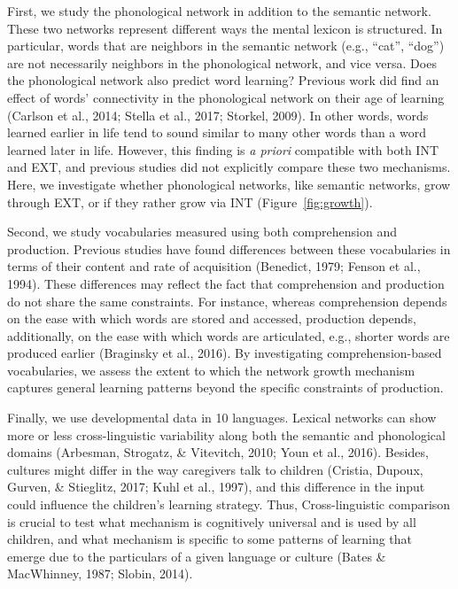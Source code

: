 \documentclass[english,floatsintext,man]{apa6}
\theoremstyle{definition}
\theoremstyle{definition}
\theoremstyle{definition}
\theoremstyle{remark}
\begin{document}
First, we study the phonological network in addition to the semantic
network. These two networks represent different ways the mental lexicon
is structured. In particular, words that are neighbors in the semantic
network (e.g., \enquote{cat}, \enquote{dog}) are not necessarily
neighbors in the phonological network, and vice versa. Does the
phonological network also predict word learning? Previous work did find
an effect of words' connectivity in the phonological network on their
age of learning (Carlson et al., 2014; Stella et al., 2017; Storkel,
2009). In other words, words learned earlier in life tend to sound
similar to many other words than a word learned later in life. However,
this finding is \emph{a priori} compatible with both INT and EXT, and
previous studies did not explicitly compare these two mechanisms. Here,
we investigate whether phonological networks, like semantic networks,
grow through EXT, or if they rather grow via INT
(Figure~\ref{fig:growth}).

Second, we study vocabularies measured using both comprehension and
production. Previous studies have found differences between these
vocabularies in terms of their content and rate of acquisition
(Benedict, 1979; Fenson et al., 1994). These differences may reflect the
fact that comprehension and production do not share the same
constraints. For instance, whereas comprehension depends on the ease
with which words are stored and accessed, production depends,
additionally, on the ease with which words are articulated, e.g.,
shorter words are produced earlier (Braginsky et al., 2016). By
investigating comprehension-based vocabularies, we assess the extent to
which the network growth mechanism captures general learning patterns
beyond the specific constraints of production.

Finally, we use developmental data in 10 languages. Lexical networks can
show more or less cross-linguistic variability along both the semantic
and phonological domains (Arbesman, Strogatz, \& Vitevitch, 2010; Youn
et al., 2016). Besides, cultures might differ in the way caregivers talk
to children (Cristia, Dupoux, Gurven, \& Stieglitz, 2017; Kuhl et al.,
1997), and this difference in the input could influence the children's
learning strategy. Thus, Cross-linguistic comparison is crucial to test
what mechanism is cognitively universal and is used by all children, and
what mechanism is specific to some patterns of learning that emerge due
to the particulars of a given language or culture (Bates \& MacWhinney,
1987; Slobin, 2014).
\end{document}

